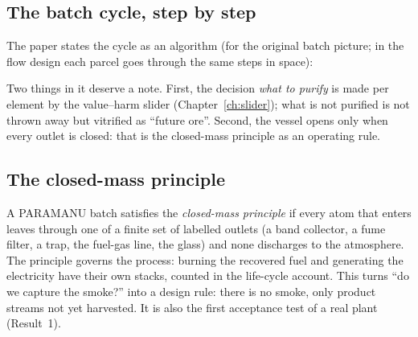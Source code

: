 \documentclass[11pt,a4paper]{article}
\begin{document}
\subsection{The batch cycle, step by step}
The paper states the cycle as an algorithm (for the original batch picture; in the flow design each parcel goes through the same steps in space):
\begin{algorithm}[H]
\caption{Atomize-First cycle for one parcel of residue, from sealed hot zone to separated elements}

\end{algorithm}
\noindent Two things in it deserve a note. First, the decision \emph{what to purify} is made per element by the value--harm slider (Chapter~\ref{ch:slider}); what is not purified is not thrown away but vitrified as ``future ore''. Second, the vessel opens only when every outlet is closed: that is the closed-mass principle as an operating rule.

\subsection{The closed-mass principle}
A PARAMANU batch satisfies the \emph{closed-mass principle} if every atom that enters leaves through one of a finite set of labelled outlets (a band collector, a fume filter, a trap, the fuel-gas line, the glass) and none discharges to the atmosphere. The principle governs the process: burning the recovered fuel and generating the electricity have their own stacks, counted in the life-cycle account. This turns ``do we capture the smoke?'' into a design rule: there is no smoke, only product streams not yet harvested. It is also the first acceptance test of a real plant (Result~1).
\end{document}
